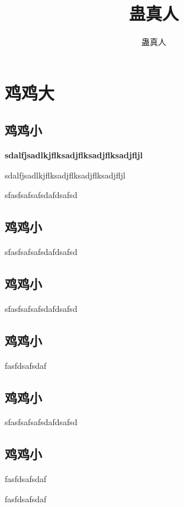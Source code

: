\documentclass[hyperref,UTF8]{ctexrep}
\title{蛊真人}
\author{蛊真人}
\newenvironment{thisBody}
	{
		\zihao{3}
	}%
	{
		\clearpage
	}%
\begin{document}
\maketitle%
\tableofcontents%
 

\chapter{鸡鸡大}
\section{鸡鸡小}
	\begin{thisBody} 
		\textbf {sdalfjsadlkjflksadjflksadjflksadjfljl}

		sdalfjsadlkjflksadjflksadjflksadjfljl

		sfasfsafsafsdafdsafsd
	\end{thisBody}
\section{鸡鸡小}
	\begin{thisBody} 
		sfasfsafsafsdafdsafsd
	\end{thisBody}
\section{鸡鸡小}
	\begin{thisBody} 
		sfasfsafsafsdafdsafsd
	\end{thisBody}
\section{鸡鸡小}
	\begin{thisBody} 
		fasfdsafsdaf 
	\end{thisBody}
\section{鸡鸡小}
	\begin{thisBody} 
		sfasfsafsafsdafdsafsd
	\end{thisBody}
\section{鸡鸡小}
	\begin{thisBody} 
		fasfdsafsdaf 

		fasfdsafsdaf 
	\end{thisBody}
\end{document}
